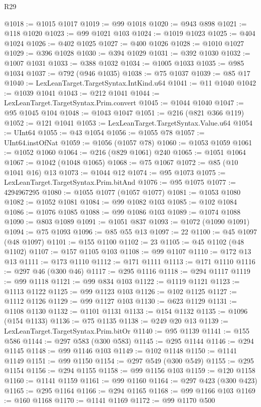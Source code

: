 \begin{lexlean}{R29}
\begin{coremodule}
@1018 := @1015 @1017
@1019 := @99 @1018
@1020 := @943 @898
@1021 := @118 @1020
@1023 := @99 @1021 @103
@1024 := @1019 @1023
@1025 := @404 @1024
@1026 := @402 @1025
@1027 := @400 @1026
@1028 := @1010 @1027
@1029 := @396 @1028
@1030 := @394 @1029
@1031 := @392 @1030
@1032 := @1007 @1031
@1033 := @388 @1032
@1034 := @1005 @1033
@1035 := @985 @1034
@1037 := @792 (@946 @1035)
@1038 := @75 @1037
@1039 := @85 @17
@1040 := LexLeanTarget.TargetSyntax.IntKind.u64
@1041 := @11 @1040
@1042 := @1039 @1041
@1043 := @212 @1041
@1044 := LexLeanTarget.TargetSyntax.Prim.convert
@1045 := @1044 @1040
@1047 := @95 @1045 @104
@1048 := @1043 @1047
@1051 := @216 (@821 @366 @119)
@1052 := @121 @1041
@1053 := LexLeanTarget.TargetSyntax.Value.u64
@1054 := UInt64
@1055 := @43 @1054
@1056 := @1055 @78
@1057 := UInt64.instOfNat
@1059 := @1056 (@1057 @78)
@1060 := @1053 @1059
@1061 := @1052 @1060
@1064 := @216 (@829 @1061) @240
@1065 := @1051 @1064
@1067 := @1042 (@1048 @1065)
@1068 := @75 @1067
@1072 := @85 (@10 @1041 @16) @13
@1073 := @1044 @12
@1074 := @95 @1073
@1075 := LexLeanTarget.TargetSyntax.Prim.bitAnd
@1076 := @95 @1075
@1077 := 4294967295
@1080 := @1055 @1077 (@1057 @1077)
@1081 := @1053 @1080
@1082 := @1052 @1081
@1084 := @99 @1082 @103
@1085 := @102 @1084
@1086 := @1076 @1085
@1088 := @99 @1086 @103
@1089 := @1074 @1088
@1090 := @803 @1089
@1091 := @1051 @837
@1093 := @1072 (@1090 @1091)
@1094 := @75 @1093
@1096 := @85 @55 @13
@1097 := 22
@1100 := @45 @1097 (@48 @1097)
@1101 := @155 @1100
@1102 := 23
@1105 := @45 @1102 (@48 @1102)
@1107 := @157 @1105 @103
@1108 := @99 @1107
@1110 := @172 @13 @13
@1111 := @173 @1110
@1112 := @171 @1111
@1113 := @171 @1110
@1116 := @297 @46 (@300 @46)
@1117 := @295 @1116
@1118 := @294 @1117
@1119 := @99 @1118
@1121 := @99 @834 @103
@1122 := @1119 @1121
@1123 := @1113 @1122
@1125 := @99 @1123 @103
@1126 := @102 @1125
@1127 := @1112 @1126
@1129 := @99 @1127 @103
@1130 := @623 @1129
@1131 := @1108 @1130
@1132 := @1101 @1131
@1133 := @154 @1132
@1135 := @1096 (@154 @1133)
@1136 := @75 @1135
@1138 := @249 @20 @13
@1139 := LexLeanTarget.TargetSyntax.Prim.bitOr
@1140 := @95 @1139
@1141 := @155 @586
@1144 := @297 @583 (@300 @583)
@1145 := @295 @1144
@1146 := @294 @1145
@1148 := @99 @1146 @103
@1149 := @102 @1148
@1150 := @1141 @1149
@1151 := @99 @1150
@1154 := @297 @549 (@300 @549)
@1155 := @295 @1154
@1156 := @294 @1155
@1158 := @99 @1156 @103
@1159 := @120 @1158
@1160 := @1141 @1159
@1161 := @99 @1160
@1164 := @297 @423 (@300 @423)
@1165 := @295 @1164
@1166 := @294 @1165
@1168 := @99 @1166 @103
@1169 := @160 @1168
@1170 := @1141 @1169
@1172 := @99 @1170 @500

\end{coremodule}
\end{lexlean}
